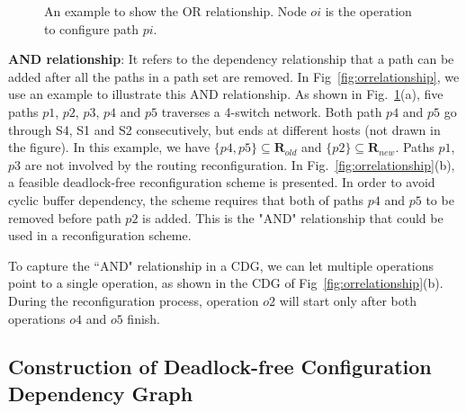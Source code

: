 \begin{figure}[t]
	\centering
	
	
	
	\caption{An example to show the OR relationship. Node $oi$ is the operation to configure path $pi$. }\label{fig:andrelationship}
	
\end{figure}

\textbf{AND relationship}: It refers to the dependency relationship that a path can be added after all the paths in a path set are removed. In Fig~\ref{fig:orrelationship}, we use an example to illustrate this AND relationship. As shown in Fig.~\ref{fig:andrelationship}(a), five paths $p1$, $p2$, $p3$, $p4$ and $p5$ traverses a 4-switch network. Both path $p4$ and $p5$ go through S4, S1 and S2 consecutively, but ends at different hosts (not drawn in the figure). In this example, we have $\{p4, p5\}\subseteq \textbf{R}_{old}$ and $\{p2\}\subseteq \textbf{R}_{new}$. Paths $p1$, $p3$ are not involved by the routing reconfiguration.  In Fig.~\ref{fig:orrelationship}(b), a feasible deadlock-free reconfiguration scheme is presented. In order to avoid cyclic buffer dependency, the scheme requires that both of paths $p4$ and $p5$ to be removed before path $p2$ is added. This is the "AND" relationship that could be used in a reconfiguration scheme.

To capture the ``AND" relationship in a CDG, we can let multiple operations point to a single operation, as shown  in the CDG of Fig~\ref{fig:orrelationship}(b). During the reconfiguration process, operation $o2$ will start only after both operations $o4$ and $o5$ finish.

\subsection{Construction of Deadlock-free Configuration Dependency Graph}\label{subsec:dfcdg}

